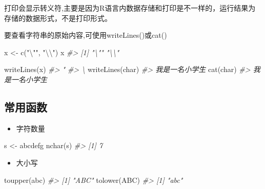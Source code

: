 \documentclass[
]{book}
\newenvironment{Shaded}{\begin{snugshade}}{\end{snugshade}}
\newcommand{\CommentTok}[1]{\textcolor[rgb]{0.56,0.35,0.01}{\textit{#1}}}
\newcommand{\FunctionTok}[1]{\textcolor[rgb]{0.00,0.00,0.00}{#1}}
\newcommand{\NormalTok}[1]{#1}
\newcommand{\OtherTok}[1]{\textcolor[rgb]{0.56,0.35,0.01}{#1}}
\newcommand{\SpecialCharTok}[1]{\textcolor[rgb]{0.00,0.00,0.00}{#1}}
\newcommand{\StringTok}[1]{\textcolor[rgb]{0.31,0.60,0.02}{#1}}
\providecommand{\tightlist}{%
  \setlength{\itemsep}{0pt}\setlength{\parskip}{0pt}}
\begin{document}
打印会显示转义符,主要是因为R语言内数据存储和打印是不一样的，运行结果为存储的数据形式，不是打印形式。

要查看字符串的原始内容,可使用writeLines()或cat()

\begin{Shaded}
\begin{Highlighting}[]
\NormalTok{x }\OtherTok{\textless{}{-}} \FunctionTok{c}\NormalTok{(}\StringTok{"}\SpecialCharTok{\textbackslash{}"}\StringTok{"}\NormalTok{, }\StringTok{"}\SpecialCharTok{\textbackslash{}\textbackslash{}}\StringTok{"}\NormalTok{)}
\NormalTok{x}
\CommentTok{\#\textgreater{} [1] "\textbackslash{}"" "\textbackslash{}\textbackslash{}"}

\FunctionTok{writeLines}\NormalTok{(x)}
\CommentTok{\#\textgreater{} "}
\CommentTok{\#\textgreater{} \textbackslash{}}
\FunctionTok{writeLines}\NormalTok{(char)}
\CommentTok{\#\textgreater{} 我是一名\textquotesingle{}小学生\textquotesingle{}}
\FunctionTok{cat}\NormalTok{(char)}
\CommentTok{\#\textgreater{} 我是一名\textquotesingle{}小学生\textquotesingle{}}
\end{Highlighting}
\end{Shaded}

\hypertarget{ux5e38ux7528ux51fdux6570}{%
\subsection{常用函数}\label{ux5e38ux7528ux51fdux6570}}

\begin{itemize}
\tightlist
\item
  字符数量
\end{itemize}

\begin{Shaded}
\begin{Highlighting}[]
\NormalTok{s }\OtherTok{\textless{}{-}} \StringTok{\textquotesingle{}abcdefg\textquotesingle{}}
\FunctionTok{nchar}\NormalTok{(s)}
\CommentTok{\#\textgreater{} [1] 7}
\end{Highlighting}
\end{Shaded}

\begin{itemize}
\tightlist
\item
  大小写
\end{itemize}

\begin{Shaded}
\begin{Highlighting}[]
\FunctionTok{toupper}\NormalTok{(}\StringTok{\textquotesingle{}abc\textquotesingle{}}\NormalTok{)}
\CommentTok{\#\textgreater{} [1] "ABC"}
\FunctionTok{tolower}\NormalTok{(}\StringTok{\textquotesingle{}ABC\textquotesingle{}}\NormalTok{)}
\CommentTok{\#\textgreater{} [1] "abc"}
\end{Highlighting}
\end{Shaded}
\end{document}
